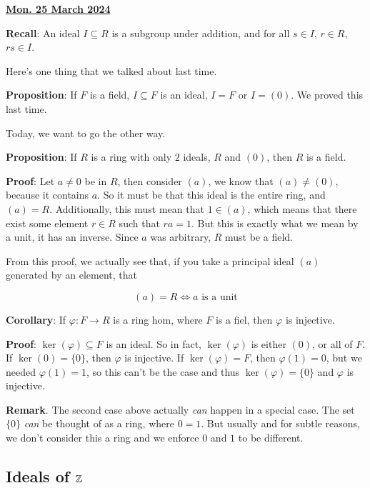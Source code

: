 \documentclass[12pt]{article}
\renewcommand{\date}[1]{\underline{\bf #1}}
\begin{document}
\date{Mon. 25 March 2024}

{\bf Recall}: An ideal $I \subseteq R$ is a subgroup under addition, and for all
$s \in I$, $r \in R$, $rs \in I$.

Here's one thing that we talked about last time.

{\bf Proposition}: If $F$ is a field, $I \subseteq F$ is an ideal, $I = F$ or $I
= (0)$. We proved this last time.

Today, we want to go the other way.

{\bf Proposition}: If $R$ is a ring with only $2$ ideals, $R$ and $(0)$, then
$R$ is a field.

{\bf Proof}: Let $a \ne 0$ be in $R$, then consider $(a)$, we know that $(a) \ne
(0)$, because it contains $a$. So it must be that this ideal is the entire ring,
and $(a) = R$. Additionally, this must mean that $1 \in (a)$, which means that
there exist some element $r \in R$ such that $ra = 1$. But this is exactly what
we mean by a unit, it has an inverse. Since $a$ was arbitrary, $R$ must be a
field.

From this proof, we actually see that, if you take a principal ideal $(a)$
generated by an element, that

\[
  (a) = R \Leftrightarrow a \text{ is a unit}
\]

{\bf Corollary}: If $\varphi: F \to R$ is a ring hom, where $F$ is a fiel, then
$\varphi$ is injective.

{\bf Proof}: $\ker(\varphi) \subseteq F$ is an ideal. So in fact,
$\ker(\varphi)$ is either $(0)$, or all of $F$. If $\ker(0) = \{0\}$, then
$\varphi$ is injective. If $\ker(\varphi) = F$, then $\varphi(1) = 0$, but we
needed $\varphi(1) = 1$, so this can't be the case and thus $\ker(\varphi) =
\{0\}$ and $\varphi$ is injective.

{\bf Remark}. The second case above actually {\it can} happen in a special case.
The set $\{0\}$ {\it can} be thought of as a ring, where $0 = 1$. But usually
and for subtle reasons, we don't consider this a ring and we enforce $0$ and $1$
to be different.

\subsection{Ideals of ${\mathbb Z}$}

\end{document}
